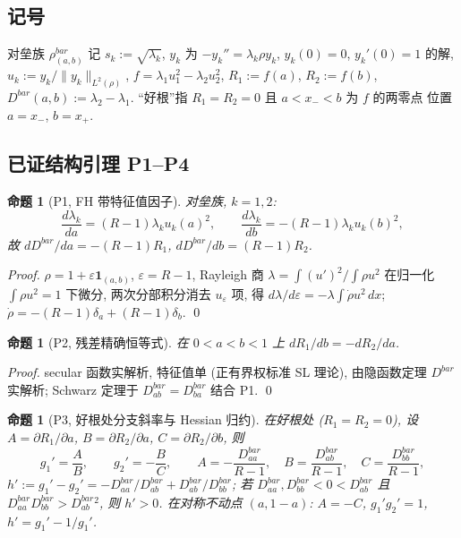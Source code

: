\documentclass[UTF8]{ctexart}
\newtheorem{proposition}[theorem]{命题}
\begin{document}
\subsection{记号}
对垒族 $\rho^{bar}_{(a,b)}$ 记 $s_k:=\sqrt{\lambda_k}$, $y_k$ 为
$-y_k''=\lambda_k\rho y_k$, $y_k(0)=0$, $y_k'(0)=1$ 的解, $u_k:=y_k/\|y_k\|_{L^2(\rho)}$,
$f=\lambda_1u_1^2-\lambda_2u_2^2$, $R_1:=f(a)$, $R_2:=f(b)$,
$D^{bar}(a,b):=\lambda_2-\lambda_1$. ``好根''指 $R_1=R_2=0$ 且 $a<x_-<b$ 为 $f$ 的两零点
位置 $a=x_-$, $b=x_+$.

\subsection{已证结构引理 P1--P4}
\begin{proposition}[P1, FH 带特征值因子]
对垒族, $k=1,2$:
\begin{equation}
	\frac{d\lambda_k}{da}=(R-1)\lambda_ku_k(a)^2,\qquad
	\frac{d\lambda_k}{db}=-(R-1)\lambda_ku_k(b)^2,
\end{equation}
故 $dD^{bar}/da=-(R-1)R_1$, $dD^{bar}/db=(R-1)R_2$.
\end{proposition}
\begin{proof}
$\rho=1+\varepsilon\mathbf 1_{(a,b)}$, $\varepsilon=R-1$, Rayleigh 商
$\lambda=\int(u')^2/\int\rho u^2$ 在归一化 $\int\rho u^2=1$ 下微分, 两次分部积分消去
$u_\varepsilon$ 项, 得 $d\lambda/d\varepsilon=-\lambda\int\dot\rho u^2\,dx$;
$\dot\rho=- (R-1)\delta_a+(R-1)\delta_b$. \qed
\end{proof}

\begin{proposition}[P2, 残差精确恒等式]
在 $0<a<b<1$ 上 $dR_1/db=-dR_2/da$.
\end{proposition}
\begin{proof}
secular 函数实解析, 特征值单 (正有界权标准 SL 理论), 由隐函数定理 $D^{bar}$ 实解析;
Schwarz 定理于 $D^{bar}_{ab}=D^{bar}_{ba}$ 结合 P1. \qed
\end{proof}

\begin{proposition}[P3, 好根处分支斜率与 Hessian 归约]
在好根处 ($R_1=R_2=0$), 设 $A=\partial R_1/\partial a$, $B=\partial R_2/\partial a$,
$C=\partial R_2/\partial b$, 则
\begin{equation}
	g_1'=\frac AB,\qquad g_2'=-\frac BC,\qquad
	A=-\frac{D^{bar}_{aa}}{R-1},\quad
	B=\frac{D^{bar}_{ab}}{R-1},\quad
	C=\frac{D^{bar}_{bb}}{R-1},
\end{equation}
$h':=g_1'-g_2'=-D^{bar}_{aa}/D^{bar}_{ab}+D^{bar}_{ab}/D^{bar}_{bb}$;
若 $D^{bar}_{aa},D^{bar}_{bb}<0<D^{bar}_{ab}$ 且 $D^{bar}_{aa}D^{bar}_{bb}>D^{bar}_{ab}{}^2$,
则 $h'>0$. 在对称不动点 $(a,1-a)$: $A=-C$, $g_1'g_2'=1$, $h'=g_1'-1/g_1'$.
\end{proposition}
\end{document}
